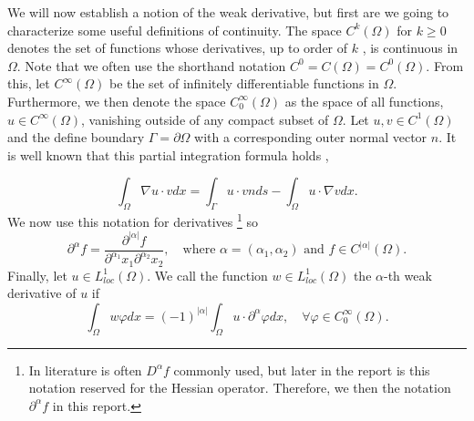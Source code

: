 We will now establish a notion of the weak derivative, but first are we going to characterize some useful definitions of continuity. The space $C^{k}\left( \Omega  \right) $ for $k\ge 0$ denotes the set of functions whose derivatives, up to order of
$k$ , is continuous in $\Omega $. Note that we often use the shorthand notation $ C^{0} = C\left( \Omega  \right)  = C^{0}\left( \Omega  \right) $.
From this, let $C^{\infty}\left( \Omega  \right) $ be the set of infinitely differentiable functions in $\Omega $. Furthermore, we then denote the space $C^{\infty}_{0}\left( \Omega  \right)$ as the space of all functions, $u \in C^{\infty}\left( \Omega
\right) $, vanishing outside of any compact subset of $\Omega $. Let $u,v \in  C^{1}\left( \Omega  \right) $ and the define boundary $\Gamma  = \partial \Omega $ with a corresponding outer normal vector $n$. It is well known that this partial
integration formula holds \cite{manzoni2021optimal},

\[
\int_{\Omega }^{} \nabla u \cdot v dx = \int_{\Gamma }^{} u\cdot v n ds - \int_{\Omega }^{} u \cdot \nabla v dx.
\]
We now use this notation for derivatives
\footnote{In literature is often $D^{\alpha } f$ commonly used, but later in the report is this notation reserved for the Hessian operator. Therefore, we then the notation $\partial ^{\alpha } f$ in this report.} so
\begin{equation}
\label{eq:mixed_derivative}
\partial ^{\alpha  } f = \frac{\partial ^{\left\lvert \alpha  \right\rvert } f}{ \partial ^{\alpha _{1} } x_{1} \partial ^{\alpha _{2}} x_{2}  }, \quad \text{where } \alpha=\left( \alpha _{1}, \alpha _{2} \right) \text{ and } f \in C^{\left\lvert \alpha  \right\rvert }
\left( \Omega  \right)
.\end{equation}
Finally, let $u \in  L^{1}_{loc}\left( \Omega  \right) $. We call the function $w \in L_{loc}^{1}\left( \Omega  \right) $ the $\alpha $-th weak derivative of $u$  if \[
\int_{\Omega }^{} w \varphi  dx = \left( -1 \right) ^{\left\lvert \alpha  \right\rvert } \int_{\Omega }^{} u \cdot \partial ^{\alpha } \varphi dx, \quad \forall \varphi \in  C_{0}^{\infty}\left( \Omega  \right).
\]


